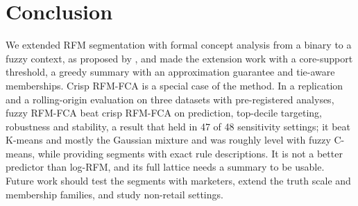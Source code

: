 \section{Conclusion}\label{sec:conclusion}

We extended RFM segmentation with formal concept analysis from a binary to a fuzzy context, as proposed by \citet{rungruang2024}, and made the extension work with a core-support threshold, a greedy summary with an approximation guarantee and tie-aware memberships. Crisp RFM-FCA is a special case of the method. In a replication and a rolling-origin evaluation on three datasets with pre-registered analyses, fuzzy RFM-FCA beat crisp RFM-FCA on prediction, top-decile targeting, robustness and stability, a result that held in 47 of 48 sensitivity settings; it beat K-means and mostly the Gaussian mixture and was roughly level with fuzzy C-means, while providing segments with exact rule descriptions. It is not a better predictor than log-RFM, and its full lattice needs a summary to be usable. Future work should test the segments with marketers, extend the truth scale and membership families, and study non-retail settings.
